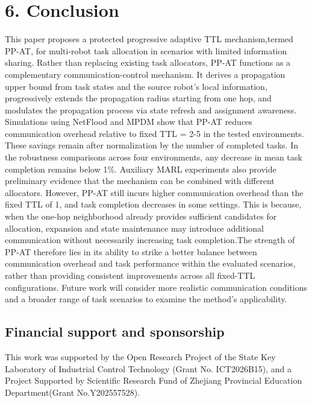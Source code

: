 \documentclass[type=submission,name=IR]{oae}
\begin{document}
\section{6. Conclusion}
This paper proposes a protected progressive adaptive TTL mechanism,termed PP-AT, for multi-robot task allocation in scenarios with limited information sharing. Rather than replacing existing task allocators, PP-AT functions as a complementary communication-control mechanism. It derives a propagation upper bound from task states and the source robot's local information, progressively extends the propagation radius starting from one hop, and modulates the propagation process via state refresh and assignment awareness. Simulations using NetFlood and MPDM show that PP-AT reduces communication overhead relative to fixed TTL = 2-5 in the tested environments. These savings remain after normalization by the number of completed tasks. In the robustness comparisons across four environments, any decrease in mean task completion remains below 1\%. Auxiliary MARL experiments also provide preliminary evidence that the mechanism can be combined with different allocators. However, PP-AT still incurs higher communication overhead than the fixed TTL of 1, and task completion decreases in some settings. This is because, when the one-hop neighborhood already provides sufficient candidates for allocation, expansion and state maintenance may introduce additional communication without necessarily increasing task completion.The strength of PP-AT therefore lies in its ability to strike a better balance between communication overhead and task performance within the evaluated scenarios, rather than providing consistent improvements across all fixed-TTL configurations. Future work will consider more realistic communication conditions and a broader range of task scenarios to examine the method's applicability.










\subsection{Financial support and sponsorship}
This work was supported by the Open Research Project of the State Key Laboratory of Industrial Control Technology (Grant No. ICT2026B15), and a Project Supported by Scientific Research Fund of Zhejiang Provincial Education Department(Grant No.Y202557528).
\end{document}
